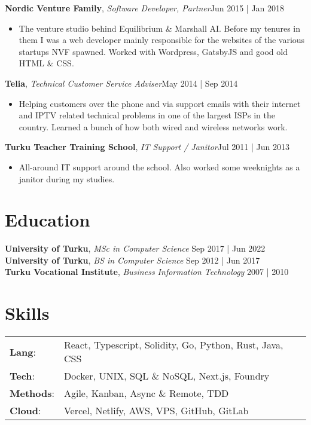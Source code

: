 \documentclass[line,margin]{res}
\begin{document}
\begin{resume}
	\textbf{Nordic Venture Family}, {\sl Software Developer, Partner}\hfill Jun 2015 | Jan 2018\\
	\begin{itemize} \itemsep 3pt
	\item The venture studio behind Equilibrium \& Marshall AI. Before my tenures in them I was a web developer mainly responsible for the websites of the various startups NVF spawned. Worked with Wordpress, GatsbyJS and good old HTML \& CSS.
	\end{itemize}

	\textbf{Telia}, {\sl Technical Customer Service Adviser}\hfill May 2014 | Sep 2014\\
	\begin{itemize} \itemsep 3pt
	\item Helping customers over the phone and via support emails with their internet and IPTV related technical problems in one of the largest ISPs in the country. Learned a bunch of how both wired and wireless networks work.
	\end{itemize}

	\textbf{Turku Teacher Training School}, {\sl IT Support / Janitor}\hfill Jul 2011 | Jun 2013\\
	\begin{itemize} \itemsep 3pt
	\item All-around IT support around the school. Also worked some weeknights as a janitor during my studies.
	\end{itemize}

	\section{Education}
	\textbf{University of Turku}, {\sl MSc in Computer Science} \hfill Sep 2017 | Jun 2022\\
	\textbf{University of Turku}, {\sl BS in Computer Science} \hfill Sep 2012 | Jun 2017\\
	\textbf{Turku Vocational Institute}, {\sl Business Information Technology} \hfill 2007 | 2010\\

	\section{Skills}
	\begin{tabular}{@{}ll}
		\textbf{Lang}:    & React, Typescript, Solidity, Go, Python, Rust, Java, CSS \\
		\textbf{Tech}:    & Docker, UNIX, SQL \& NoSQL, Next.js, Foundry             \\
		\textbf{Methods}: & Agile, Kanban, Async \& Remote, TDD                      \\
		\textbf{Cloud}:   & Vercel, Netlify, AWS, VPS, GitHub, GitLab                \\
	\end{tabular}

\end{resume}
\end{document}
